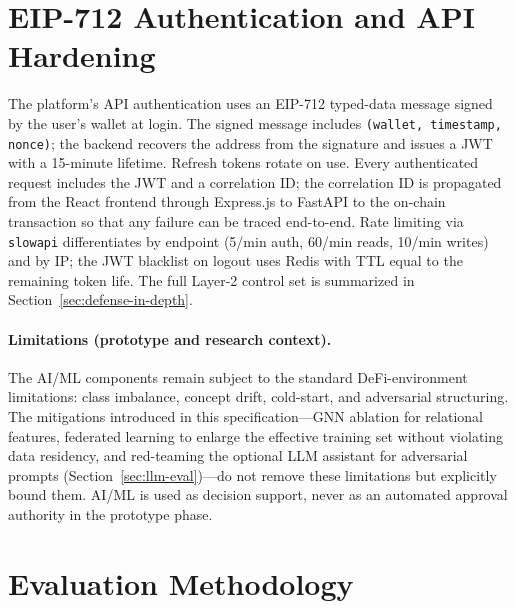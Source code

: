 \documentclass[12pt,a4paper]{report}
\begin{document}
\section{EIP-712 Authentication and API Hardening}
\label{sec:eip712-auth}

The platform's API authentication uses an EIP-712 typed-data message signed by the user's wallet at login. The signed message includes \texttt{(wallet, timestamp, nonce)}; the backend recovers the address from the signature and issues a JWT with a 15-minute lifetime. Refresh tokens rotate on use. Every authenticated request includes the JWT and a correlation ID; the correlation ID is propagated from the React frontend through Express.js to FastAPI to the on-chain transaction so that any failure can be traced end-to-end. Rate limiting via \texttt{slowapi} differentiates by endpoint (5/min auth, 60/min reads, 10/min writes) and by IP; the JWT blacklist on logout uses Redis with TTL equal to the remaining token life. The full Layer-2 control set is summarized in Section~\ref{sec:defense-in-depth}.

\paragraph{Limitations (prototype and research context).}
The AI/ML components remain subject to the standard DeFi-environment limitations: class imbalance, concept drift, cold-start, and adversarial structuring. The mitigations introduced in this specification---GNN ablation for relational features, federated learning to enlarge the effective training set without violating data residency, and red-teaming the optional LLM assistant for adversarial prompts (Section~\ref{sec:llm-eval})---do not remove these limitations but explicitly bound them. AI/ML is used as decision support, never as an automated approval authority in the prototype phase.

\section{Evaluation Methodology}
\label{sec:eval-method}
\end{document}
